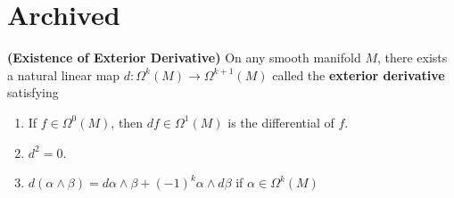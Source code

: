 \documentclass{report}
\begin{document}
\section{Archived}
\begin{theorem}
\textbf{(Existence of Exterior Derivative)} On any smooth manifold $M$, there exists a natural linear map  $d:\Omega^k(M)\rightarrow \Omega^{k+1}(M)$ called the \textbf{exterior derivative} satisfying 
\begin{enumerate}[label=(\alph*)]
  \item If $f \in \Omega^0(M)$, then $df\in \Omega^1(M)$ is the differential of $f$. 
  \item $d^2=0$.
  \item  $d (\alpha \wedge  \beta  )=d\alpha \wedge  \beta +(-1)^k \alpha \wedge  d\beta   $ if $ \alpha  \in \Omega^k(M)$
\end{enumerate}
\end{theorem}
\end{document}
